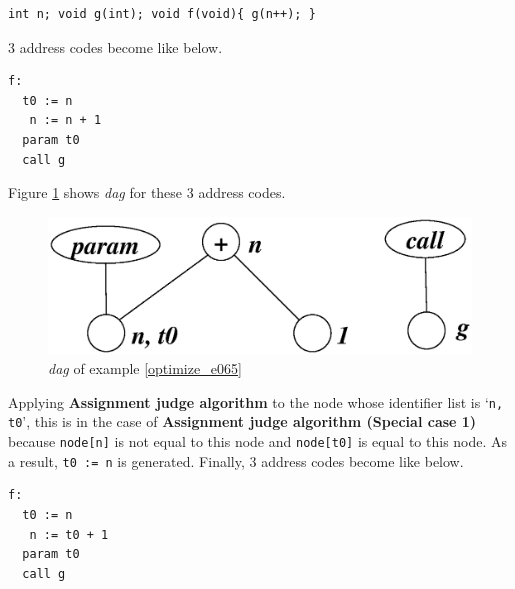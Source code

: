 \begin{Example}
\label{optimize_e065}
\begin{verbatim}
int n; void g(int); void f(void){ g(n++); }
\end{verbatim}
3 address codes become like below.
\begin{verbatim}
f:
  t0 := n
   n := n + 1
  param t0
  call g
\end{verbatim}
Figure \ref{optimize_e066} shows {\em dag} for these 3 address codes.
\begin{figure}[htbp]
\begin{center}
\includegraphics[width=1.0\linewidth,height=0.328\linewidth]{opt027.eps}
\caption{{\em dag} of example \ref{optimize_e065}}
\label{optimize_e066}
\end{center}
\end{figure}
Applying {\bf Assignment judge
 algorithm} to the node whose identifier list is `{\tt{n, t0}}',
this is in the case
of {\bf Assignment judge algorithm (Special case 1)}
because {\tt{node[n]}} is not equal to this node and
{\tt{node[t0]}} is equal to this node.
As a result, {\tt{t0 := n}} is generated.
Finally, 3 address codes become like below.
\begin{verbatim}
f:
  t0 := n
   n := t0 + 1
  param t0
  call g
\end{verbatim}
\end{Example}

